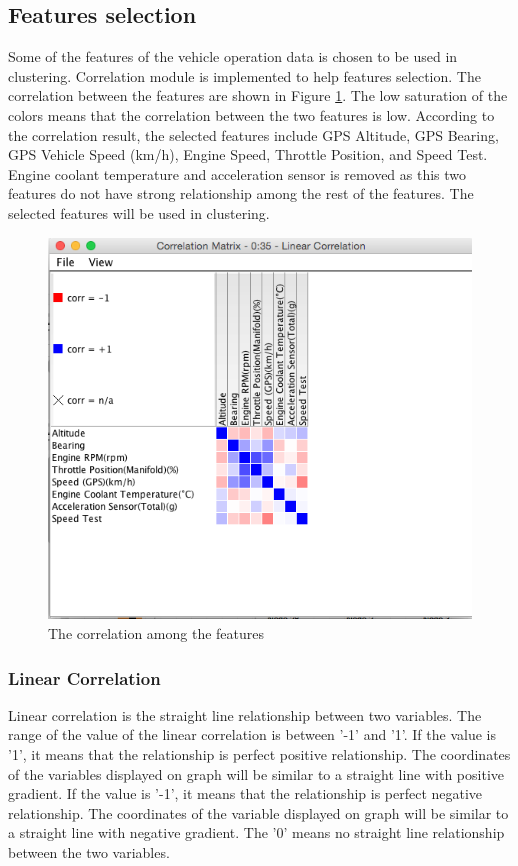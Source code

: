 \subsection{Features selection}
Some of the features of the vehicle operation data is chosen to be used in clustering. Correlation module is implemented to help features selection. The correlation between the features are shown in Figure \ref{fig:correlation}. The low saturation of the colors means that the correlation between the two features is low. According to the correlation result, the selected features include GPS Altitude, GPS Bearing, GPS Vehicle Speed (km/h), Engine Speed, Throttle Position, and Speed Test. Engine coolant temperature and acceleration sensor is removed as this two features do not have strong relationship among the rest of the features. The selected features will be used in clustering.

\begin{figure}[hbt!]\centering
\includegraphics[height=.5\textwidth]{image/KNIMEcorrelation}
\caption{The correlation among the features}
\label{fig:correlation}
\end{figure}

\subsubsection{Linear Correlation}
Linear correlation is the straight line relationship between two variables. The range of the value of the linear correlation is between '-1' and '1'. If the value is '1', it means that the relationship is perfect positive relationship. The coordinates of the variables displayed on graph will be similar to a straight line with positive gradient. If the value is '-1', it means that the relationship is perfect negative relationship. The coordinates of the variable displayed on graph will be similar to a straight line with negative gradient. The '0' means no straight line relationship between the two variables.

